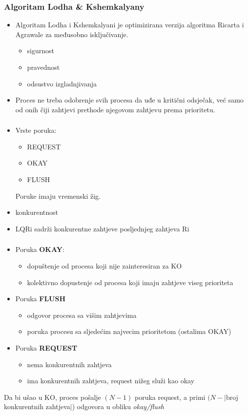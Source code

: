 \documentclass[11pt]{beamer}
\begin{document}
\begin{frame}
	\frametitle{Algoritam Lodha \& Kshemkalyany}
	\begin{itemize}
		\item Algoritam Lodha i Kshemkalyani je optimizirana verzija algoritma Ricarta i Agrawale za međusobno isključivanje.
		 \begin{itemize}
			\item sigurnost \checkmark
			\item pravednost \checkmark
			\item odsustvo izgladnjivanja \checkmark
		\end{itemize}
		\item Proces ne treba odobrenje svih procesa da uđe u kritični odsječak, već samo od onih čiji zahtjevi prethode njegovom zahtjevu prema prioritetu. 
	\end{itemize}
\end{frame}
\begin{frame}
	\frametitle{}
	\begin{itemize}
		\item Vrste poruka:
		\begin{itemize}
			\item REQUEST
			\item OKAY
			\item FLUSH
		\end{itemize}
		Poruke imaju vremenski žig.
		\item konkurentnost
		\item LQRi sadrži konkurentne zahtjeve posljednjeg zahtjeva Ri
	\end{itemize}
	
\end{frame}
\begin{frame}
	\frametitle{}
	\begin{itemize}
		\item Poruka \textbf{OKAY}:
		\begin{itemize}
			\item  dopuštenje od procesa koji nije zainteresiran za KO
			\item kolektivno dopustenje od procesa koji imaju zahtjeve viseg prioriteta
		\end{itemize}
		\item Poruka \textbf{FLUSH}
		\begin{itemize}
			\item odgovor procesa sa višim zahtjevima
			\item poruka procesu sa sljedećim najvecim prioritetom (ostalima OKAY)
		\end{itemize}
		\item Poruka \textbf{REQUEST}
		\begin{itemize}
			\item nema konkurentnih zahtjeva 
			\item ima konkurentnih zahtjeva, request nižeg služi kao okay
		\end{itemize}
	\end{itemize}
	Da bi ušao u KO, proces pošalje $(N-1)$ poruka request, a primi $(N - |$broj konkurentnih zahtjeva$|$) odgovora u obliku \textit{okay/flush}
	
\end{frame}
\end{document}
